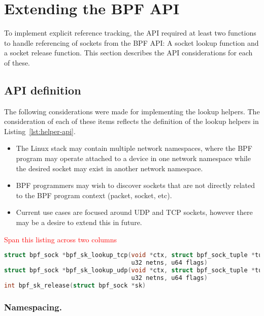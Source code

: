 \documentclass[10pt,sigconf,authorversion]{lpc}
\newcommand\todo[1]{\textcolor{red}{#1}}
\begin{document}
\section{Extending the BPF API}

To implement explicit reference tracking, the API required at least two
functions to handle referencing of sockets from the BPF API: A socket lookup
function and a socket release function. This section describes the API
considerations for each of these.

\subsection{API definition}

The following considerations were made for implementing the lookup helpers. The
consideration of each of these items reflects the definition of the lookup
helpers in Listing~\ref{lst:helper-api}.

\begin{itemize}
    \item The Linux stack may contain multiple network namespaces, where the
          BPF program may operate attached to a device in one network namespace
          while the desired socket may exist in another network namespace.
    \item BPF programmers may wish to discover sockets that are not directly
          related to the BPF program context (packet, socket, etc).
    \item Current use cases are focused around UDP and TCP sockets, however
          there may be a desire to extend this in future.
\end{itemize}

\todo{Span this listing across two columns}
\begin{lstlisting}[caption={BPF API helper functions for socket lookup},language=c,label=lst:helper-api,breaklines=true]
struct bpf_sock *bpf_sk_lookup_tcp(void *ctx, struct bpf_sock_tuple *tuple, u32 tuple_size,
                                   u32 netns, u64 flags)
struct bpf_sock *bpf_sk_lookup_udp(void *ctx, struct bpf_sock_tuple *tuple, u32 tuple_size,
                                   u32 netns, u64 flags)
int bpf_sk_release(struct bpf_sock *sk)
\end{lstlisting}

\subsubsection{Namespacing.}
\end{document}
